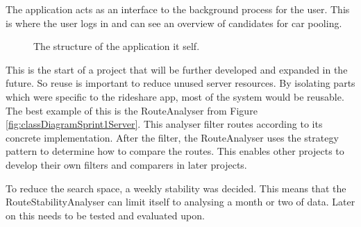 The application acts as an interface to the background process for the user.
This is where the user logs in and can see an overview of candidates for car pooling.

\begin{figure}[h]
	\centering
	
	\caption{The structure of the application it self.}
	\label{fig:classDiagramSprint1Application}
\end{figure}

This is the start of a project that will be further developed and expanded in the future.
So reuse is important to reduce unused server resources.
By isolating parts which were specific to the rideshare app, most of the system would be reusable.
The best example of this is the RouteAnalyser from Figure \ref{fig:classDiagramSprint1Server}.
This analyser filter routes according to its concrete implementation.
After the filter, the RouteAnalyser uses the strategy pattern to determine how to compare the routes.
This enables other projects to develop their own filters and comparers in later projects.

To reduce the search space, a weekly stability was decided. 
This means that the RouteStabilityAnalyser can limit itself to analysing a month or two of data.
Later on this needs to be tested and evaluated upon.